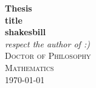 
\begin{titlepage}
    \begin{center}
      {\huge\bfseries Thesis \\[1ex] 
                      title}                  \\[6.5ex]
      {\large\bfseries shakesbill}           \\
      \vspace{4ex}
      \textit{respect the author of :)}                \\[2cm]
      \textsc{\Large Doctor of Philosophy}    \\[2ex]
      \textsc{\large Mathematics}             \\[12ex]
      \today
    \end{center}
\end{titlepage}
